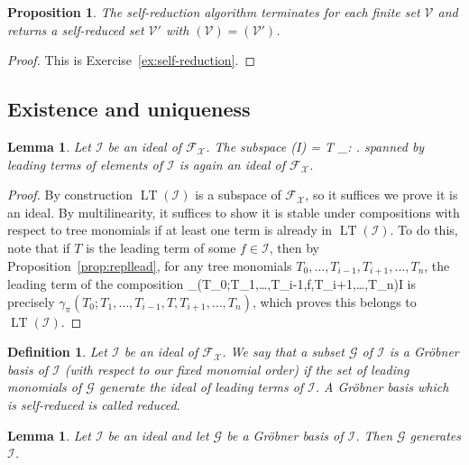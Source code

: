 \documentclass[fleqn, a4paper, twoside]{article}
\makeatletter
\newcommand{\lead}[1]{\operatorname{LT}(#1)}
\newcommand{\0}{\langle 0\rangle}
\newcommand{\XX}{\mathcal{X}}
\newcommand{\FF}{\mathcal{F}}
\let\[\@undefined
\DeclareRobustCommand{\[}{\begin{equation}}%
\let\]\@undefined
\DeclareRobustCommand{\]}{\end{equation}}%
\theoremstyle{mytheorem}
\newtheorem{proposition}[theorem]{Proposition}
\newtheorem{lemma}[theorem]{Lemma}
\theoremstyle{introthm}
\theoremstyle{mydefinition}
\newtheorem{definition}[theorem]{Definition}
\theoremstyle{mydefinition2}
\theoremstyle{plain} %
\newcommand{\?}{\,?\,}
\theoremstyle{mytheorem}
\theoremstyle{plain} %
\makeatother
\begin{document}
 \begin{proposition}\label{lemma:self-reduction}
 The self-reduction algorithm terminates for each
 finite set $\mathcal V$ and returns a self-reduced
 set $\mathcal V'$ with $(\mathcal V) = (\mathcal V')$.
\end{proposition}  

\begin{proof}
This is Exercise~\ref{ex:self-reduction}.
\end{proof}
\subsection{Existence and uniqueness}

\begin{lemma}
Let $\mathcal I$ be an ideal of $\FF_\XX$. The subspace 
\[
\lead{\mathcal I} = \langle T \in \FF_\XX : \text{ $T = 
	\lead{f}$ for some  $f\in\mathcal I$} \rangle.
\]
spanned by leading terms of elements of $\mathcal I$ is
again an ideal of $\FF_\XX$.
\end{lemma}

\begin{proof}
By construction $\lead{\mathcal I}$ is a subspace of $\FF_\XX$, so 
it suffices we prove it is an ideal. By multilinearity, it suffices
to show it is stable under compositions with respect to tree
monomials if at least one term is already in $\lead{\mathcal I}$.
To do this, note that if
$T$ is the leading term of some $f\in\mathcal I$, then by
Proposition~\ref{prop:repllead}, for any tree monomials
$T_0,\ldots,T_{i-1},T_{i+1},\ldots,T_n$, the leading term
of the composition 
\[ \gamma_\pi(T_0;T_1,\ldots,T_{i-1},f,T_{i+1},\ldots,T_n)\in \mathcal I\]
is precisely $\gamma_\pi(T_0;T_1,\ldots,T_{i-1},T,T_{i+1},\ldots,T_n)$,
which proves this belongs to $\lead{\mathcal I}$.
\end{proof}

\begin{definition}
Let $\mathcal I$ be an ideal of $\FF_\XX$. We say that a subset
$\mathcal G$ of $\mathcal I$ is a \emph{Gr\"obner basis of $\mathcal I$}
(with respect to our fixed monomial order) if the set of leading monomials
of $\mathcal G$ generate the ideal of leading terms of $\mathcal I$.
A Gr\"obner basis which is self-reduced is called reduced.
\end{definition}

\begin{lemma}
Let $\mathcal I$ be an ideal and let $\mathcal G$ be a 
Gr\"obner basis of $\mathcal I$. Then $\mathcal G$ 
generates $\mathcal I$.  
\end{lemma}
\end{document}
